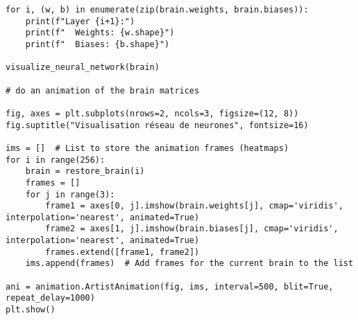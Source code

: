 \documentclass[11pt,a4paper]{article}
\begin{document}
\begin{verbatim}
for i, (w, b) in enumerate(zip(brain.weights, brain.biases)):
    print(f"Layer {i+1}:")
    print(f"  Weights: {w.shape}")
    print(f"  Biases: {b.shape}")

visualize_neural_network(brain)

# do an animation of the brain matrices

fig, axes = plt.subplots(nrows=2, ncols=3, figsize=(12, 8))
fig.suptitle("Visualisation réseau de neurones", fontsize=16)

ims = []  # List to store the animation frames (heatmaps)
for i in range(256):
    brain = restore_brain(i)
    frames = []  
    for j in range(3):
        frame1 = axes[0, j].imshow(brain.weights[j], cmap='viridis', interpolation='nearest', animated=True)
        frame2 = axes[1, j].imshow(brain.biases[j], cmap='viridis', interpolation='nearest', animated=True)
        frames.extend([frame1, frame2])
    ims.append(frames)  # Add frames for the current brain to the list

ani = animation.ArtistAnimation(fig, ims, interval=500, blit=True, repeat_delay=1000)
plt.show()
\end{verbatim}
\end{document}
